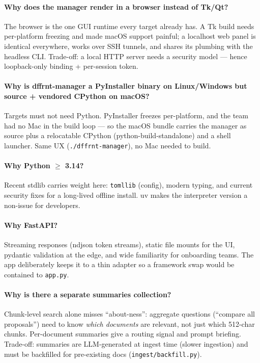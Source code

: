 \documentclass[11pt,letterpaper]{article}
\begin{document}
\paragraph{Why does the manager render in a browser instead of Tk/Qt?}
The browser is the one GUI runtime every target already has. A Tk build
needs per-platform freezing and made macOS support painful; a localhost web
panel is identical everywhere, works over SSH tunnels, and shares its
plumbing with the headless CLI. Trade-off: a local HTTP server needs a
security model --- hence loopback-only binding + per-session token.

\paragraph{Why is dffrnt-manager a PyInstaller binary on Linux/Windows but source + vendored CPython on macOS?}
Targets must not need Python. PyInstaller freezes per-platform, and the
team had no Mac in the build loop --- so the macOS bundle carries the
manager as source plus a relocatable CPython (python-build-standalone) and
a shell launcher. Same UX (\texttt{./dffrnt-manager}), no Mac needed to
build.

\paragraph{Why Python $\geq$ 3.14?}
Recent stdlib carries weight here: \texttt{tomllib} (config), modern
typing, and current security fixes for a long-lived offline install. uv
makes the interpreter version a non-issue for developers.

\paragraph{Why FastAPI?}
Streaming responses (ndjson token streams), static file mounts for the UI,
pydantic validation at the edge, and wide familiarity for onboarding teams.
The app deliberately keeps it to a thin adapter so a framework swap would
be contained to \texttt{app.py}.

\paragraph{Why is there a separate summaries collection?}
Chunk-level search alone misses ``about-ness'': aggregate questions
(``compare all proposals'') need to know \emph{which documents} are
relevant, not just which 512-char chunks. Per-document summaries give a
routing signal and prompt briefing. Trade-off: summaries are LLM-generated
at ingest time (slower ingestion) and must be backfilled for pre-existing
docs (\texttt{ingest/backfill.py}).
\end{document}
